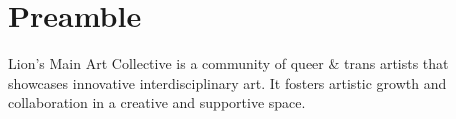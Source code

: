 \chapter*{Preamble}

Lion's Main Art Collective is a community of queer \& trans artists that showcases innovative interdisciplinary art. It fosters artistic growth and collaboration in a creative and supportive space.
